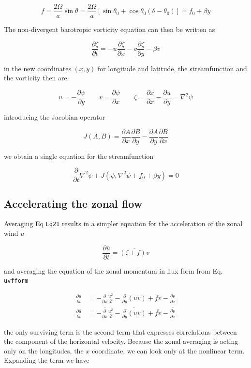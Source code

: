 \[f = \frac{ 2 \Omega }{a}\sin\theta= \frac{ 2 \Omega }{a}\left[ \sin\theta_0 + \cos\theta_0(\theta - \theta_0)\right] = f_0 + \beta y\]

The non-divergent barotropic vorticity equation can then be written as

\[\frac{\partial \zeta}{\partial t} = - u \frac{\partial \zeta}{\partial x} - v\frac{\partial \zeta}{\partial y} - \beta v\]

in the new coordinates \((x,y)\) for longitude and latitude, the
streamfunction and the vorticity then are

\[u=-\frac{\partial \psi}{\partial y}\qquad v=\frac{\partial \psi}{\partial x} \qquad
\zeta = \frac{\partial x}{\partial x} -\frac{\partial u}{\partial y}=\nabla^2\psi\]

introducing the Jacobian operator

\[J(A,B) = \frac{\partial A}{\partial x}\frac{\partial B}{\partial y} - \frac{\partial A}{\partial y}\frac{\partial B}{\partial x}\]

we obtain a single equation for the streamfunction

\[\frac{\partial }{\partial t}\nabla^2\psi  + J(\psi, \nabla^2\psi +f_0 + \beta y) = 0\]

\subsection{Accelerating the zonal flow}\label{accelerating-the-zonal-flow}

Averaging Eq \texttt{Eq21} results in a simpler equation for the
acceleration of the zonal wind \(u\)

\[\frac{\partial \bar{u}}{\partial t} = \overline{(\zeta+f) v}\]

and averaging the equation of the zonal momentum in flux form from Eq.
\texttt{uvfform}

\[\begin{aligned}
\frac{\partial u}{\partial t} &= -\frac{\partial }{\partial x}\frac{u^2}{2} -\frac{\partial }{\partial y}(u v) +f v -\frac{\partial p}{\partial x}\\
\frac{\partial \bar{u}}{\partial t} &= \overline{-\frac{\partial }{\partial x}\frac{u^2}{2}} -\overline{\frac{\partial }{\partial y}(u v)} +\overline{f v} -\overline{\frac{\partial p}{\partial x}}
\end{aligned}\]

the only surviving term is the second term that expresses correlations
between the component of the horizontal velocity. Because the zonal
averaging is acting only on the longitudes, the \(x\) coordinate, we can
look only at the nonlinear term. Expanding the term we have


